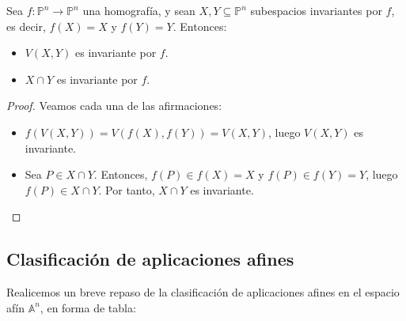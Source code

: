 \begin{proposición}
    Sea $f: \mathbb{P}^n \to \mathbb{P}^n$ una homografía, y sean $X, Y \subseteq \mathbb{P}^n$ subespacios invariantes por $f$, es decir, $f(X) = X$ y $f(Y) = Y$. Entonces:
    \begin{itemize}
        \item $V(X,Y)$ es invariante por $f$.
        \item $X \cap Y$ es invariante por $f$.
    \end{itemize}
\end{proposición}

\begin{proof}
    Veamos cada una de las afirmaciones:
    \begin{itemize}
        \item $f(V(X,Y)) = V(f(X), f(Y)) = V(X,Y)$, luego $V(X,Y)$ es invariante.
        \item Sea $P \in X \cap Y$. Entonces, $f(P) \in f(X) = X$ y $f(P) \in f(Y) = Y$, luego $f(P) \in X \cap Y$. Por tanto, $X \cap Y$ es invariante.
    \end{itemize}
\end{proof}

\subsection{Clasificación de aplicaciones afines}

Realicemos un breve repaso de la clasificación de aplicaciones afines en el espacio afín $\mathbb{A}^n$, en forma de tabla:

